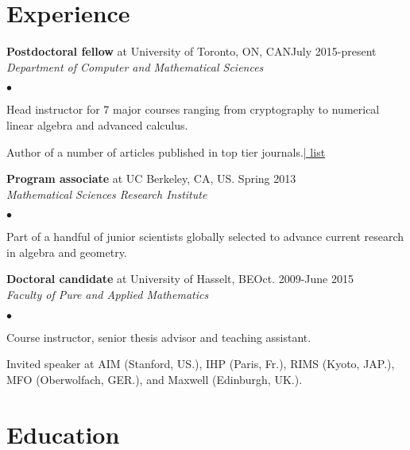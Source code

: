 \documentclass[margin,line,pifont,palatino,courierm]{res}
\newenvironment{list2}{
  \begin{list}{$\bullet$}{%
      \setlength{\itemsep}{0in}
      \setlength{\parsep}{0in} \setlength{\parskip}{0in}
      \setlength{\topsep}{0in} \setlength{\partopsep}{0in}
      \setlength{\leftmargin}{0.2in}}}{\end{list}}
\begin{document}
\begin{resume}
\vspace{0.1in}
\section{\sc Experience}

{\bf Postdoctoral fellow} at University of Toronto, ON, CAN\hfill July 2015-present\\
\emph{Department of Computer and Mathematical Sciences}
\vspace{.1in}
\begin{list2}
\item Head instructor for  7 major courses ranging from cryptography to numerical linear algebra and advanced calculus.
\vspace{0.05in}
\item Author of a number of articles published in top tier journals.\hfill  \hyperlink{}\href{https://arxiv.org/find/math/1/au:+Volcsey_L/0/1/0/all/0/1}{\hfill | \footnotesize \color{link}  list}
\end{list2}

{\bf Program associate} at UC Berkeley, CA, US. \hfill  Spring 2013\\ 
\emph{Mathematical Sciences Research Institute}
\vspace{.1in}
\begin{list2}
\item Part of a handful of junior scientists globally selected to advance current research in algebra and geometry.
\end{list2}


{\bf Doctoral candidate} at University of Hasselt, BE\hfill Oct. 2009-June 2015\\
\emph{Faculty of Pure and Applied Mathematics}
\vspace{.1in}
\begin{list2}
\item Course instructor, senior thesis advisor and teaching assistant. 
\vspace{0.05in}
\item Invited speaker at AIM (Stanford, US.), IHP (Paris, Fr.), RIMS (Kyoto, JAP.), MFO (Oberwolfach, GER.), and Maxwell (Edinburgh, UK.).
\end{list2}



\section{\sc Education}



\end{resume}
\end{document}
